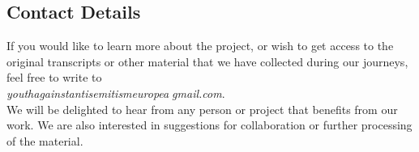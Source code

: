 \subsection*{Contact Details}
If you would like to learn more about the project, or wish to get access to the original transcripts or other material that we have collected during our journeys, feel free to write to \\ \textit{youthagainstantisemitismeurope\textcircled{a}gmail.com}. \\
We will be delighted to hear from any person or project that benefits from our work. We are also interested in suggestions for collaboration or further processing of the material.
